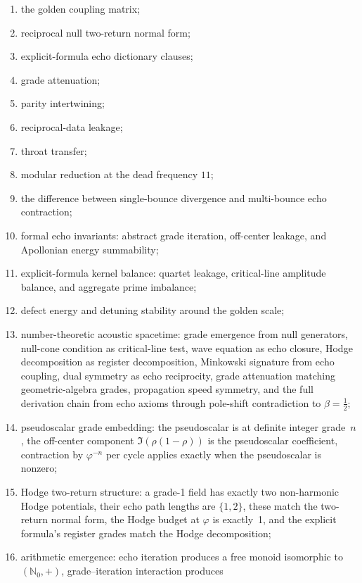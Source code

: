 \documentclass[11pt,a4paper]{article}
\theoremstyle{plain}
\theoremstyle{definition}
\theoremstyle{remark}
\numberwithin{equation}{section}
\newcommand{\Nat}{\mathbb{N}}
\newcommand{\vp}{\varphi}
\begin{document}
\begin{enumerate}
  \item the golden coupling matrix;
  \item reciprocal null two-return normal form;
  \item explicit-formula echo dictionary clauses;
  \item grade attenuation;
  \item parity intertwining;
  \item reciprocal-data leakage;
  \item throat transfer;
  \item modular reduction at the dead frequency \(11\);
  \item the difference between single-bounce divergence and multi-bounce
    echo contraction;
  \item formal echo invariants: abstract grade iteration, off-center
    leakage, and Apollonian energy summability;
  \item explicit-formula kernel balance: quartet leakage, critical-line
    amplitude balance, and aggregate prime imbalance;
  \item defect energy and detuning stability around the golden scale;
  \item number-theoretic acoustic spacetime: grade emergence
    from null generators, null-cone condition as critical-line test,
    wave equation as echo closure, Hodge decomposition as register
    decomposition, Minkowski signature from echo coupling, dual symmetry
    as echo reciprocity, grade attenuation matching geometric-algebra grades,
    propagation speed symmetry, and the full derivation chain from echo
    axioms through pole-shift contradiction to \(\beta=\tfrac12\);
  \item pseudoscalar grade embedding: the pseudoscalar is at definite
    integer grade~\(n\), the off-center component
    \(\Im(\rho(1-\rho))\) is the pseudoscalar coefficient, contraction
    by \(\vp^{-n}\) per cycle applies exactly when the pseudoscalar is
    nonzero;
  \item Hodge two-return structure: a grade-1 field has exactly two
    non-harmonic Hodge potentials, their echo path lengths are
    \(\{1,2\}\), these match the two-return normal form, the Hodge
    budget at \(\vp\) is exactly~1, and the explicit formula's register
    grades match the Hodge decomposition;
  \item arithmetic emergence: echo iteration produces a free monoid
    isomorphic to \((\Nat_0,+)\), grade--iteration interaction produces

\end{enumerate}
\end{document}
